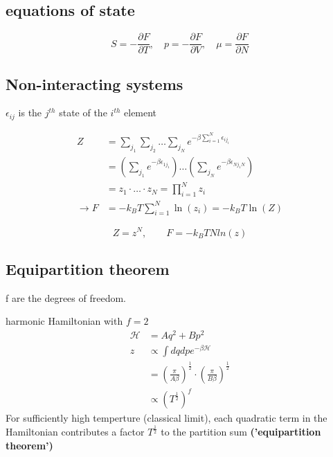 \subsection*{equations of state}
\begin{equation*}
    S = - \frac{\partial F}{\partial T}, \quad p = - \frac{\partial F}{\partial V}, \quad \mu = \frac{\partial F}{\partial N}
\end{equation*}

\subsection*{Non-interacting systems}
$\epsilon_{ij}$ is the $j^{th}$ state of the $i^{th}$ element

\begin{equation*}
    \begin{aligned}
        Z &= \sum_{j_1} \sum_{j_2} \dots \sum_{j_N} e^{-\beta \sum_{i=1}^N \epsilon_{ij_i}} \\
        &= \left(\sum_{j_1} e^{-\beta \epsilon_{1j_1}}\right) \dots \left(\sum_{j_N} e^{-\beta \epsilon_{Nj_1N}}\right) \\
        &= z_1 \cdot \dots \cdot z_N = \prod_{i=1}^N z_i \\
        \rightarrow F &= -k_B T \sum_{i=1}^N \ln(z_i) = -k_B T \ln(Z)
    \end{aligned}
\end{equation*}

\begin{equation*}
    Z = z^N , \qquad F = -k_B T N ln(z)
\end{equation*}

\subsection*{Equipartition theorem}
f are the degrees of freedom.

harmonic Hamiltonian with $f=2$
\begin{equation*}
    \begin{aligned}
        \mathcal{H} &= Aq^2 + Bp^2 \\
        z &\propto \int dq dp e^{-\beta \mathcal{H}} \\
        &= \left(\frac{\pi}{A\beta}\right)^{\frac{1}{2}} \cdot \left(\frac{\pi}{B \beta}\right)^{\frac{1}{2}} \\
        &\propto \left(T^{\frac{1}{2}}\right)^f
    \end{aligned}
\end{equation*}
For sufficiently high temperture (classical limit), each quadratic term 
in the Hamiltonian contributes a factor $T^{\frac{1}{2}}$ to the partition sum \textbf{('equipartition theorem')}

